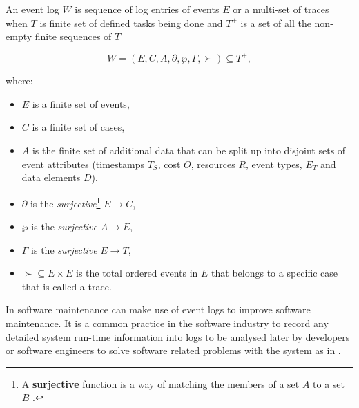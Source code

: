 An event log $W$ is sequence of log entries of events $E$ or a multi-set of traces when $T$ is finite set of defined tasks being done and $T^+$ is a set of all the non-empty finite sequences of $T$ \cite{Kherbouche2017}

\begin{equation}
	\label{eq:LogEvent}
	W = (E, C, A, \partial, \wp, \Gamma, \succ) \subseteq T^+,
\end{equation}

where:

\begin{itemize}
	\item $E$ is a finite set of events,
	\item $C$ is a finite set of cases,
	\item $A$ is the finite set of additional data that can be split up into disjoint sets of event attributes (timestamps $T_S$, cost $O$, resources $R$, event types, $E_T$ and data elements $D$),
	\item $\partial$ is the \textit{surjective}\footnote{\label{ftn:Surjective}A \textbf{surjective} function is a way of matching the members of a set $A$ to a set $B$ \cite{Szendrei1990}.} $E\rightarrow C$,
	\item $\wp$ is the \textit{surjective} $A\rightarrow E$,
	\item $\Gamma$ is the \textit{surjective} $E\rightarrow T$,
	\item $\succ \subseteq E\times E$ is the total ordered events in $E$ that belongs to a specific case that is called a trace.
\end{itemize}

In  software maintenance can make use of event logs to improve software maintenance. It is a common practice in the software industry to record any detailed system run-time information into logs to be analysed later by developers or software engineers to solve software related problems with the system as in  \cite{Zhu2019}.

